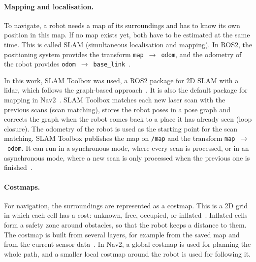 \paragraph{Mapping and localisation.} To navigate, a robot needs a map of its surroundings and has to know its own position in this map. If no map exists yet, both have to be estimated at the same time. This is called SLAM (simultaneous localisation and mapping). In ROS2, the positioning system provides the transform \texttt{map}~$\rightarrow$~\texttt{odom}, and the odometry of the robot provides \texttt{odom}~$\rightarrow$~\texttt{base\_link}~\citep{nav2_concepts}.

In this work, SLAM Toolbox was used, a ROS2 package for 2D SLAM with a lidar, which follows the graph-based approach~\citep{slam_toolbox,grisetti2010}. It is also the default package for mapping in Nav2~\citep{nav2_concepts}. SLAM Toolbox matches each new laser scan with the previous scans (scan matching), stores the robot poses in a pose graph and corrects the graph when the robot comes back to a place it has already seen (loop closure). The odometry of the robot is used as the starting point for the scan matching. SLAM Toolbox publishes the map on \texttt{/map} and the transform \texttt{map}~$\rightarrow$~\texttt{odom}. It can run in a synchronous mode, where every scan is processed, or in an asynchronous mode, where a new scan is only processed when the previous one is finished~\citep{slam_toolbox}.

\paragraph{Costmaps.} For navigation, the surroundings are represented as a costmap. This is a 2D grid in which each cell has a cost: unknown, free, occupied, or inflated~\citep{nav2_concepts}. Inflated cells form a safety zone around obstacles, so that the robot keeps a distance to them. The costmap is built from several layers, for example from the saved map and from the current sensor data~\citep{nav2_concepts}. In Nav2, a global costmap is used for planning the whole path, and a smaller local costmap around the robot is used for following it.

